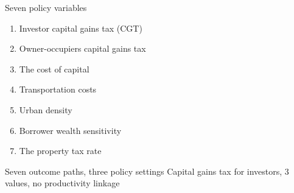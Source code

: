 \documentclass[]{beamer} %
\newcommand\Wider[2][3em]{
\makebox[\linewidth][c]{%
  \begin{minipage}{\dimexpr\textwidth+#1\relax}
  \raggedright#2
  \end{minipage}%
  }%
}
\begin{document}
\begin{frame}{Seven policy variables}\Large
\begin{enumerate}%
\item Investor capital gains tax (CGT)
\item Owner-occupiers capital gains tax
\item The cost of capital%
\item Transportation costs%
\item Urban density%
\item Borrower wealth sensitivity%
\item The property tax rate%
\end{enumerate}


\end{frame}%





\begin{frame}{Seven outcome paths, three policy settings}%
\small Capital gains tax for investors, 3 values, no productivity linkage
\end{frame}
\end{document}
